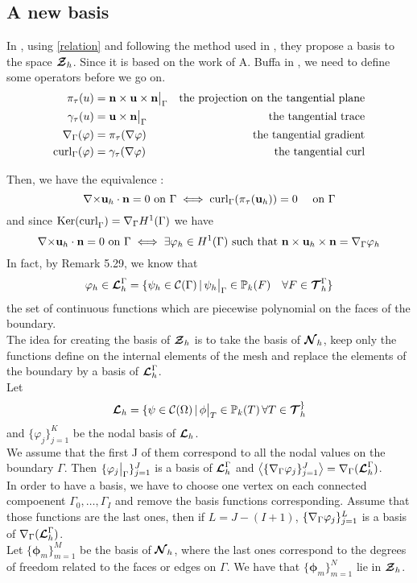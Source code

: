 \subsection{A new basis}
\label{base}
In \cite{Venegas2013}, using \ref{relation} and following the method used in
\cite{Meddahi2003,Salgado2005}, they propose a basis to the space ${\bm{\mathcal{Z}}}_h$.
Since it is based on the work of A. Buffa in \cite{Buffa2002845}, we need to
define some operators before we go on.
\begin{align*}
\pi_\tau(u) &= {\mathbf{n}}\times{\mathbf{u}}\times{\mathbf{n}}{\big\rvert_{\Gamma}} &\mbox{the projection on
  the tangential plane}\\
\gamma_\tau(u) &= {\mathbf{u}}\times{\mathbf{n}}{\big\rvert_{\Gamma}} &\mbox{the tangential
  trace}\\
{\nabla}_\Gamma(\varphi) &= \pi_\tau({\nabla}\varphi) &\mbox{the tangential gradient}\\
\mathrm{curl}_\Gamma(\varphi) &= \gamma_\tau({\nabla}\varphi) &\mbox{the tangential curl}
\end{align*}

Then, we have the equivalence :
\[ {\nabla\times}{\mathbf{u}}_h\cdot{\mathbf{n}}=0\mbox{ on }\Gamma \iff
\mathrm{curl}_\Gamma(\pi_\tau({\mathbf{u}}_h))=0\quad \mbox{ on } \Gamma \]
and since $\mathrm{Ker(curl}_\Gamma)={\nabla}_\Gamma H^1(\Gamma)$ we have 
\[ {\nabla\times}{\mathbf{u}}_h\cdot{\mathbf{n}}=0\mbox{ on }\Gamma \iff
\exists\varphi_h\in H^1(\Gamma) \mbox{ such that
}{\mathbf{n}}\times{\mathbf{u}}_h\times{\mathbf{n}} = {\nabla}_\Gamma\varphi_h \]
In fact, by \cite{Monk2003} Remark 5.29, we know that 
\[\varphi_h\in{\bm{\mathcal{L}}}_h^\Gamma = \{\psi_h\in\mathcal{C}(\Gamma) \,|\,
\psi_h{\big\rvert_{\Gamma}}\in{\mathbb{P}}_k(F) \quad \forall F\in{\bm{\mathcal{T}}}_h^\Gamma \}\]
the set of continuous functions which are piecewise polynomial on the faces of
the boundary.\\

The idea for creating the basis of ${\bm{\mathcal{Z}}}_h$ is to take the basis of ${\bm{\mathcal{N}}}_h$, keep
only the functions define on the internal elements of the mesh and replace the
elements of the boundary by a basis of ${\bm{\mathcal{L}}}_h^\Gamma$.\\

Let \[ {\bm{\mathcal{L}}}_h=\{\psi\in\mathcal{C}(\Omega) \,|\,
\phi{\big\rvert_{T}}\in{\mathbb{P}}_k(T)\,\forall T\in{\bm{\mathcal{T}}}_h^\} \]
and $\{\varphi_j\}_{j=1}^K$ be the nodal basis of ${\bm{\mathcal{L}}}_h$.\\
We assume that the first J of them correspond to all the nodal values on the
boundary $\Gamma$. Then $\{\varphi_j{\big\rvert_{\Gamma}}\}_{j=1}^J$ is a
basis of ${\bm{\mathcal{L}}}_h^\Gamma$ and
$\left\langle\{{\nabla}_\Gamma\varphi_j\}_{j=1}^J\right\rangle={\nabla}_\Gamma({\bm{\mathcal{L}}}_h^\Gamma)$.\\
In order to have a basis, we have to choose one vertex on each connected
compoenent $\Gamma_0,\dots,\Gamma_I$ and remove the basis functions
corresponding. Assume that those functions are the last ones, then if
$L=J-(I+1)$, $\{{\nabla}_\Gamma\varphi_j\}_{j=1}^L$ is a basis of
${\nabla}_\Gamma({\bm{\mathcal{L}}}_h^\Gamma)$.\\
Let $\{\bm{\phi}_m\}_{m=1}^M$ be the basis of ${\bm{\mathcal{N}}}_h$, where the last ones
correspond to the degrees of freedom related to the faces or edges on
$\Gamma$. We have that $\{\bm{\phi}_m\}_{m=1}^N$ lie in ${\bm{\mathcal{Z}}}_h$.\\

